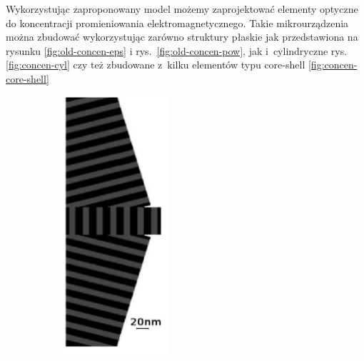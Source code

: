 Wykorzystując zaproponowany model możemy zaprojektować elementy optyczne do koncentracji promieniowania elektromagnetycznego. Takie mikrourządzenia można zbudować wykorzystując zarówno struktury płaskie jak przedstawiona na rysunku \ref{fig:old-concen-eps} i rys.~\ref{fig:old-concen-pow}, jak i~cylindryczne rys.\ref{fig:concen-cyl} czy też zbudowane z~kilku elementów typu core-shell \ref{fig:concen-core-shell}
\begin{figure}[!htb]
	\centering
	\begin{subfigure}[b]{.45\textwidth}
		\includegraphics[angle=90,width=\textwidth]{images/multilayer/konc_eps_mgr.png}

\end{subfigure}
\end{figure}
